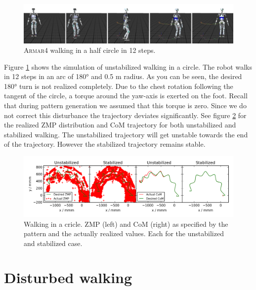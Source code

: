 \documentclass[english,ngerman]{KITreprt}
\newcommand{\name}[1]{\textsc{#1}}
\begin{document}
\begin{figure}[hbt]
\vspace*{-1em}
\includegraphics[width=\textwidth,resolution=300]{images/undisturbed_circle_thumbs.png}
\caption{\name{Armar4} walking in a half circle in 12 steps. \cite{niklaus2014videocircle}}
\label{img:player-undisturbed-circle-thumbs}
\end{figure}

Figure \ref{img:player-undisturbed-circle-thumbs} shows the simulation
of unstabilized walking in a circle. The robot walks in 12 steps in an
arc of 180° and 0.5 m radius. As you can be seen, the desired 180° turn
is not realized completely. Due to the chest rotation following the
tangent of the circle, a torque around the yaw-axis is exerted on the
foot. Recall that during pattern generation we assumed that this torque
is zero. Since we do not correct this disturbance the trajectory
deviates significantly. See figure \ref{img:undisturbed-circle} for the
realized ZMP distribution and CoM trajectory for both unstabilized and
stabilized walking. The unstabilized trajectory will get unstable
towards the end of the trajectory. However the stabilized trajectory
remains stable.

\begin{figure}[hbt]
\vspace*{-1em}
\includegraphics[width=\textwidth,resolution=300]{images/undisturbed_circle.png}
\caption{Walking in a cricle. ZMP (left) and CoM (right) as specified by the pattern and the actually realized values.
Each for the unstabilized and stabilized case.}
\label{img:undisturbed-circle}
\end{figure}

\section{Disturbed walking}\label{disturbed-walking}
\end{document}
